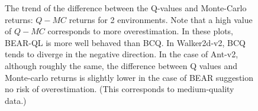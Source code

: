 \begin{figure}[h]
\begin{subfigure}[h]{0.31\textwidth}
    \end{subfigure}%
    \caption{The trend of the difference between the Q-values and Monte-Carlo returns: $Q - MC$ returns for 2 environments. Note that a high value of $Q-MC$ corresponds to more overestimation. In these plots, BEAR-QL is more well behaved than BCQ. In Walker2d-v2, BCQ tends to diverge in the negative direction. In the case of Ant-v2, although roughly the same, the difference between Q values and Monte-carlo returns is slightly lower in the case of BEAR suggestion no risk of overestimation. (This corresponds to medium-quality data.)}
    \label{fig:q_mc}
\end{figure}


